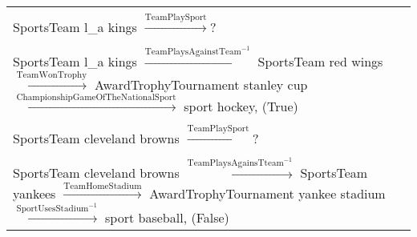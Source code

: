 \documentclass{article}
\begin{document}
\begin{table*}[!h]
{\begin{tabular}{l l}
			\\ \\
			\textsf{SportsTeam l\_a kings} $\xrightarrow{\text{TeamPlaySport}}$? \vspace{-1mm}
			\\ \\
			\textsf{SportsTeam l\_a kings}  $\xrightarrow{\text{TeamPlaysAgainstTeam}^{-1}}$
			\textsf{SportsTeam red wings} $\xrightarrow{\text{TeamWonTrophy}}$ \textsf{AwardTrophyTournament stanley cup} $\xrightarrow{\text{ChampionshipGameOfTheNationalSport}}$ \textsf{sport hockey}, (True)
			\\ \\
			\textsf{SportsTeam cleveland browns} $\xrightarrow{\text{TeamPlaySport}}$? \vspace{-1mm}
			\\ \\
			\textsf{SportsTeam cleveland browns}  $\xrightarrow{\text{TeamPlaysAgainsTteam}^{-1}}$
			\textsf{SportsTeam yankees} $\xrightarrow{\text{TeamHomeStadium}}$ \textsf{AwardTrophyTournament yankee stadium} $\xrightarrow{\text{SportUsesStadium}^{-1}}$ \textsf{sport baseball}, (False)
			\\\hline
		\end{tabular}
 		}\label{tab:kbc_example_paths}
	\end{table*}





	

	

	





	

	
	
































 	
\end{document}
